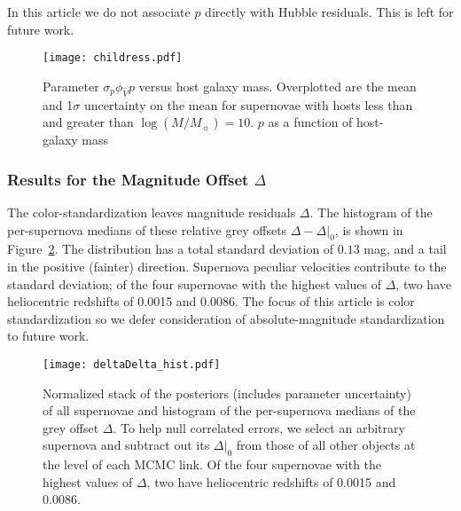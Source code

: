 \documentclass[trackchanges]{aastex62}   	%
\begin{document}
In this article we do not associate $p$ directly with Hubble residuals. This is left for future work.

\begin{figure}[htbp] %
   \centering
   \texttt{[image: childress.pdf]} 
   \caption{Parameter $\sigma_p\phi_{\hat{V}}p$  versus host galaxy mass. Overplotted are the mean and 1$\sigma$ uncertainty on the mean for supernovae with hosts
      less than and greater than  $\log{(M/M_\sun)}=10$.
 $p$ as a function of host-galaxy mass
    \label{childress3:fig}}
\end{figure}


\subsubsection{Results for the Magnitude Offset $\Delta$}
\label{Delta:sec}

The color-standardization leaves magnitude residuals $\Delta$.
The histogram of the per-supernova  medians of these relative  grey offsets $\Delta-\Delta|_0$,
is shown in Figure~\ref{hist:fig}.  The distribution
has a total standard deviation of
$0.13$
mag, and a tail in the positive (fainter) direction.
Supernova peculiar velocities contribute to the standard deviation; of the four
supernovae with the highest values of $\Delta$, two have 
heliocentric
redshifts of 0.0015 and 0.0086. 
The focus of this article is color standardization so we defer consideration of absolute-magnitude standardization to future work.
 
\begin{figure}[htbp] %
   \centering
   \texttt{[image: deltaDelta\_hist.pdf]} 
   \caption{
   Normalized stack of the posteriors  (includes parameter uncertainty) of all supernovae and histogram of the per-supernova medians of the grey offset $\Delta$. 
   To help null correlated errors, we select
    an arbitrary supernova and subtract out its $\Delta|_0$ from those of all other objects at the level of each MCMC link.
  Of the four
supernovae with the highest values of $\Delta$, two have 
heliocentric
redshifts of 0.0015 and 0.0086. 
   \label{hist:fig}}
\end{figure}
\end{document}
